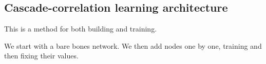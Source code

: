 
\subsection{Cascade-correlation learning architecture}

This is a method for both building and training.

We start with a bare bones network. We then add nodes one by one, training and then fixing their values.

